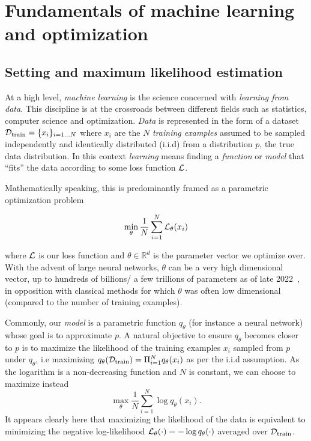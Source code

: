 \section{Fundamentals of machine learning and optimization}
\label{sec:ml}

\subsection{Setting and maximum likelihood estimation}

At a high level, \emph{machine learning} is the science concerned with \emph{learning from data}. This discipline is at the crossroads between different fields such as statistics, computer science and optimization. \emph{Data} is represented in the form of a dataset ${\mathcal{D}}_\text{train} = \{x_i\}_{i=1\dots N}$ where $x_i$ are the $N$ \emph{training examples} assumed to be sampled independently and identically distributed (i.i.d) from a distribution $p$, the true data distribution. In this context \emph{learning} means finding a \emph{function} or \emph{model} that ``fits'' the data according to some loss function ${\mathcal{L}}$.

Mathematically speaking, this is predominantly framed as a parametric optimization problem

$$\min_\theta \frac{1}{N} \sum_{i=1}^N {\mathcal{L}}_\theta(x_i)$$

where ${\mathcal{L}}$ is our loss function and $\theta \in \mathbb{R}^d$ is the parameter
vector we optimize over. With the advent of large neural networks, $\theta$ can
be a very high dimensional vector, up to hundreds of billions/ a few trillions of parameters as of late 2022~\citep{chowdhery2022palm, switch2022fedus}, in opposition with classical methods for which $\theta$ was often low dimensional (compared to the number of training examples).

Commonly, our \emph{model} is a parametric function $q_\theta$ (for instance a neural network) whose goal is to approximate $p$. A natural objective to ensure $q_\theta$ becomes closer to $p$ is to maximize the likelihood of the training examples $x_i$ sampled from $p$ under $q_\theta$, i.e maximizing $q_\theta({\mathcal{D}}_\text{train}) = \Pi_{i=1}^N q_\theta(x_i)$ as per the i.i.d assumption. As the logarithm is a non-decreasing function and $N$ is constant, we can choose to maximize instead
$$\max_\theta \frac{1}{N} \sum_{i=1}^N \log q_\theta(x_i).$$
It appears clearly here that maximizing the likelihood of the data is equivalent to minimizing the negative log-likelihood ${\mathcal{L}}_\theta(\cdot) = - \log q_\theta(\cdot)$ averaged over ${\mathcal{D}}_\text{train}$.

